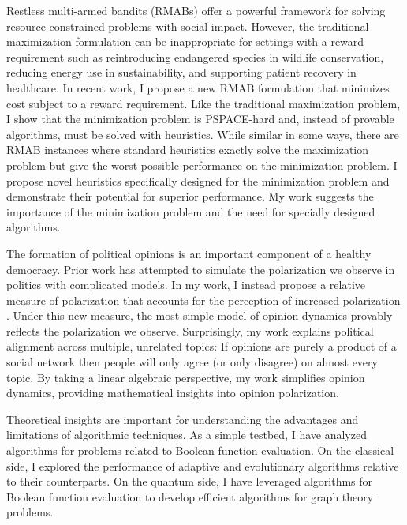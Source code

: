\documentclass[11pt]{article}
\begin{document}
Restless multi-armed bandits (RMABs) offer a powerful framework for solving resource-constrained problems with social impact.
However, the traditional maximization formulation can be inappropriate for settings with a reward requirement such as reintroducing endangered species in wildlife conservation, reducing energy use in sustainability, and supporting patient recovery in healthcare.
In recent work, I propose a new RMAB formulation that minimizes cost subject to a reward requirement.
Like the traditional maximization problem, I show that the minimization problem is PSPACE-hard and, instead of provable algorithms, must be solved with heuristics.
While similar in some ways, there are RMAB instances where standard heuristics exactly solve the maximization problem but give the worst possible performance on the minimization problem.
I propose novel heuristics specifically designed for the minimization problem and demonstrate their potential for superior performance.
My work suggests the importance of the minimization problem and the need for specially designed algorithms.

The formation of political opinions is an important component of a healthy democracy.
Prior work has attempted to simulate the polarization we observe in politics with complicated models.
In my work, I instead propose a relative measure of polarization that accounts for the perception of increased polarization \cite{musco2022quantify}.
Under this new measure, the most simple model of opinion dynamics provably reflects the polarization we observe.
Surprisingly, my work explains political alignment across multiple, unrelated topics:
If opinions are purely a product of a social network then people will only agree (or only disagree) on almost every topic.
By taking a linear algebraic perspective, my work simplifies opinion dynamics, providing mathematical insights into opinion polarization.


Theoretical insights are important for understanding the advantages and limitations of algorithmic techniques.
As a simple testbed, I have analyzed algorithms for problems related to Boolean function evaluation.
On the classical side, I explored the performance of adaptive and evolutionary algorithms relative to their counterparts.
On the quantum side, I have leveraged algorithms for Boolean function evaluation to develop efficient algorithms for graph theory problems.
\end{document}
